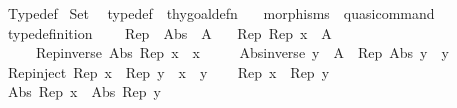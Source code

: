 %
\begin{isabellebody}%
%
%
\isadelimdocument
%
\endisadelimdocument
%
\isatagdocument
%
\isamarkuptrue%
%
\endisatagdocument
{\isafolddocument}%
%
\isadelimdocument
%
\endisadelimdocument
%
\isadelimtheory
%
\endisadelimtheory
%
\isatagtheory
{}\isamarkupfalse%
\ Typedef\isanewline
{}\ Set\isanewline
{}\isanewline
\ \ {\isachardoublequoteopen}typedef{\isachardoublequoteclose}\ {\isacharcolon}{\kern0pt}{\isacharcolon}{\kern0pt}\ thy{\isacharunderscore}{\kern0pt}goal{\isacharunderscore}{\kern0pt}defn\ \isanewline
\ \ {\isachardoublequoteopen}morphisms{\isachardoublequoteclose}\ {\isacharcolon}{\kern0pt}{\isacharcolon}{\kern0pt}\ quasi{\isacharunderscore}{\kern0pt}command\isanewline
{}%
\endisatagtheory
{\isafoldtheory}%
%
\isadelimtheory
\isanewline
%
\endisadelimtheory
\isanewline
{}\isamarkupfalse%
\ type{\isacharunderscore}{\kern0pt}definition\ {\isacharequal}{\kern0pt}\isanewline
\ \ \ Rep\ \ Abs\ \ A\isanewline
\ \ \ Rep{\isacharcolon}{\kern0pt}\ {\isachardoublequoteopen}Rep\ x\ {\isasymin}\ A{\isachardoublequoteclose}\isanewline
\ \ \ \ \ Rep{\isacharunderscore}{\kern0pt}inverse{\isacharcolon}{\kern0pt}\ {\isachardoublequoteopen}Abs\ {\isacharparenleft}{\kern0pt}Rep\ x{\isacharparenright}{\kern0pt}\ {\isacharequal}{\kern0pt}\ x{\isachardoublequoteclose}\isanewline
\ \ \ \ \ Abs{\isacharunderscore}{\kern0pt}inverse{\isacharcolon}{\kern0pt}\ {\isachardoublequoteopen}y\ {\isasymin}\ A\ {\isasymLongrightarrow}\ Rep\ {\isacharparenleft}{\kern0pt}Abs\ y{\isacharparenright}{\kern0pt}\ {\isacharequal}{\kern0pt}\ y{\isachardoublequoteclose}\isanewline
\ \ %
\isanewline
{}\isanewline
\isanewline
{}\isamarkupfalse%
\ Rep{\isacharunderscore}{\kern0pt}inject{\isacharcolon}{\kern0pt}\ {\isachardoublequoteopen}Rep\ x\ {\isacharequal}{\kern0pt}\ Rep\ y\ {\isasymlongleftrightarrow}\ x\ {\isacharequal}{\kern0pt}\ y{\isachardoublequoteclose}\isanewline
%
\isadelimproof
%
\endisadelimproof
%
\isatagproof
{}\isamarkupfalse%
\isanewline
\ \ \isamarkupfalse%
\ {\isachardoublequoteopen}Rep\ x\ {\isacharequal}{\kern0pt}\ Rep\ y{\isachardoublequoteclose}\isanewline
\ \ \isamarkupfalse%
\ \isamarkupfalse%
\ {\isachardoublequoteopen}Abs\ {\isacharparenleft}{\kern0pt}Rep\ x{\isacharparenright}{\kern0pt}\ {\isacharequal}{\kern0pt}\ Abs\ {\isacharparenleft}{\kern0pt}Rep\ y{\isacharparenright}{\kern0pt}{\isachardoublequoteclose}\ \isamarkupfalse%

\end{isabellebody}
